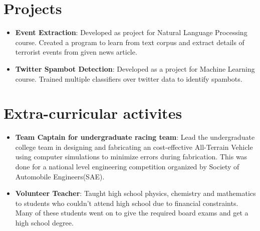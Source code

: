 \documentclass[letterpaper,11pt]{article}
\newcommand{\resumeItem}[2]{
  \item\small{
    \textbf{#1}{: #2 \vspace{-2pt}}
  }
}
\newcommand{\resumeSubItem}[2]{\resumeItem{#1}{#2}\vspace{-4pt}}
\newcommand{\resumeSubHeadingListStart}{\begin{itemize}[leftmargin=*]}
\newcommand{\resumeSubHeadingListEnd}{\end{itemize}}
\begin{document}
\section{Projects}
  \resumeSubHeadingListStart
    \resumeSubItem{Event Extraction}
      {Developed as project for Natural Language Processing course. Created a program to learn from text corpus and extract details of terrorist events from given news article.}
    \resumeSubItem{Twitter Spambot Detection}
      {Developed as a project for Machine Learning course. Trained multiple classifiers over twitter data to identify spambots.}
  \resumeSubHeadingListEnd

\section{Extra-curricular activites}
  \resumeSubHeadingListStart
    \resumeSubItem{Team Captain for undergraduate racing team}
      {Lead the undergraduate college team in designing and fabricating an cost-effective All-Terrain Vehicle using computer simulations to minimize errors during fabrication. This was done for a national level engineering competition organized by Society of Automobile Engineers(SAE).}
    \resumeSubItem{Volunteer Teacher}
      {Taught high school physics, chemistry and mathematics to students who couldn't attend high school due to financial constraints. Many of these students went on to give the required board exams and get a high school degree.}
  \resumeSubHeadingListEnd


%


\end{document}
